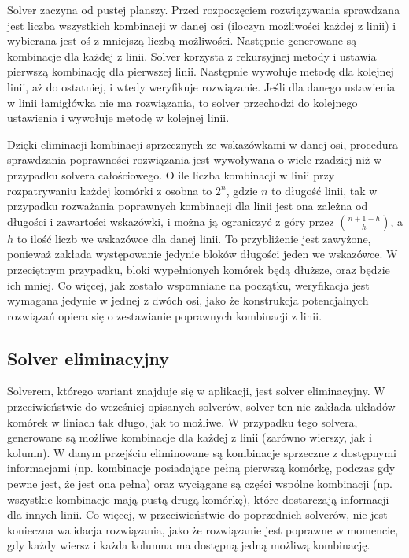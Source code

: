     Solver zaczyna od pustej planszy. Przed rozpoczęciem rozwiązywania sprawdzana jest liczba wszystkich
kombinacji w danej osi (iloczyn możliwości każdej z linii) i wybierana jest oś z mniejszą liczbą
możliwości. Następnie generowane są kombinacje dla każdej z linii. Solver korzysta z rekursyjnej
metody i ustawia pierwszą kombinację dla pierwszej linii. Następnie wywołuje metodę dla kolejnej linii,
aż do ostatniej, i wtedy weryfikuje rozwiązanie. Jeśli dla danego ustawienia w linii łamigłówka
nie ma rozwiązania, to solver przechodzi do kolejnego ustawienia i wywołuje metodę w kolejnej linii.

    Dzięki eliminacji kombinacji sprzecznych ze wskazówkami w danej osi, procedura sprawdzania
poprawności rozwiązania jest wywoływana o wiele rzadziej niż w przypadku solvera całościowego.
O ile liczba kombinacji w linii przy rozpatrywaniu każdej komórki z osobna to $2^n$, gdzie $n$ to
długość linii, tak w przypadku rozważania poprawnych kombinacji dla linii jest ona zależna od
długości i zawartości wskazówki, i można ją ograniczyć z góry przez
${n + 1 - h} \choose h$, a $h$ to ilość liczb we wskazówce dla danej linii. 
To przybliżenie jest zawyżone, ponieważ
zakłada występowanie jedynie bloków długości jeden we wskazówce. W przeciętnym przypadku, bloki
wypełnionych komórek będą dłuższe, oraz będzie ich mniej. Co więcej, jak zostało wspomniane na początku,
weryfikacja jest wymagana jedynie w jednej z dwóch osi, jako że konstrukcja potencjalnych rozwiązań
opiera się o zestawianie poprawnych kombinacji z linii.


\subsection{Solver eliminacyjny}
    Solverem, którego wariant znajduje się w aplikacji, jest solver eliminacyjny. W przeciwieństwie
do wcześniej opisanych solverów, solver ten nie zakłada układów komórek w liniach tak długo, jak to
możliwe. W przypadku tego solvera, generowane są możliwe kombinacje dla każdej z linii (zarówno wierszy, jak i
kolumn). W danym przejściu eliminowane są kombinacje sprzeczne z dostępnymi informacjami 
(np. kombinacje posiadające pełną pierwszą komórkę, podczas gdy pewne jest, że jest ona pełna) 
oraz wyciągane są części wspólne kombinacji (np. wszystkie kombinacje mają pustą drugą komórkę), 
które dostarczają informacji dla innych linii. Co więcej, w przeciwieństwie do poprzednich solverów,
nie jest konieczna walidacja rozwiązania, jako że rozwiązanie jest poprawne w momencie, gdy każdy
wiersz i każda kolumna ma dostępną jedną możliwą kombinację.

